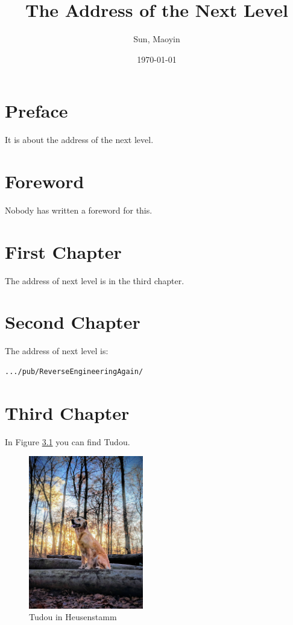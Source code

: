 \documentclass{book}
\title{The Address of the Next Level}
\author{Sun, Maoyin\cite{homepage}}
\date{\today}
\begin{document}

\maketitle

\chapter*{Preface}
\par It is about the address of the next level.

\chapter*{Foreword}
\par Nobody has written a foreword for this.

\tableofcontents
{}

\chapter{First Chapter}
\par The address of next level is in the third chapter.

\chapter{Second Chapter}
\par The address of next level is:
\begin{lstlisting}
.../pub/ReverseEngineeringAgain/
\end{lstlisting}

\chapter{Third Chapter}
\par In Figure \ref{fig:tudou1} you can find Tudou.
\begin{figure}[h]
    \centering
    \includegraphics[width=5cm]{large.jpeg}
    \caption{Tudou in Heusenstamm}
    \label{fig:tudou1}
\end{figure}
\end{document}
